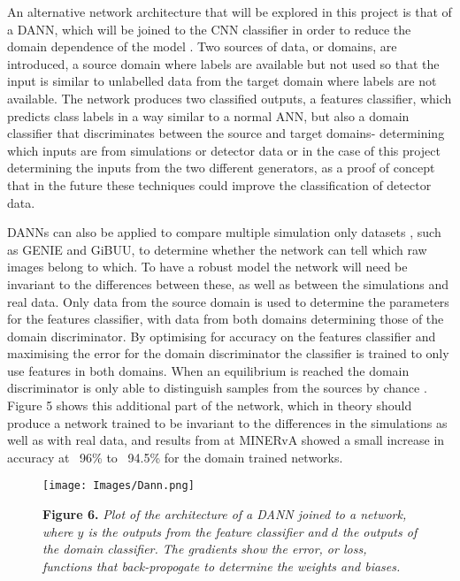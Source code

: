 \noindent An alternative network architecture that will be explored in this project is that of a DANN, which will be joined to the CNN classifier in order to reduce the domain dependence of the model \cite{Bousmalis}. Two sources of data, or domains, are introduced, a source domain where labels are available but not used so that the input is similar to unlabelled data from the target domain where labels are not available. The network produces two classified outputs, a features classifier, which predicts class labels in a way similar to a normal ANN, but also a domain classifier that discriminates between the source and target domains- determining which inputs are from simulations or detector data \cite{Ganin} or in the case of this project determining the inputs from the two different generators, as a proof of concept that in the future these techniques could improve the classification of detector data. \medskip

\noindent DANNs can also be applied to compare multiple simulation only datasets \cite{Perdue}, such as GENIE and GiBUU, to determine whether the network can tell which raw images belong to which. To have a robust model the network will need be invariant to the differences between these, as well as between the simulations and real data. Only data from the source domain is used to determine the parameters for the features classifier, with data from both domains determining those of the domain discriminator. By optimising for accuracy on the features classifier and maximising the error for the domain discriminator the classifier is trained to only use features in both domains. When an equilibrium is reached the domain discriminator is only able to distinguish samples from the sources by chance \cite{Louppe}. Figure 5 shows this additional part of the network, which in theory should produce a network trained to be invariant to the differences in the simulations as well as with real data, and results from \cite{Perdue} at MINERvA showed a small increase in accuracy at ~96\% to ~94.5\% for the domain trained networks.  \medskip

\begin{figure}[b!]
 \centering
 \texttt{[image: Images/Dann.png]} 
 
  \textbf{Figure 6.} \textit{Plot of the architecture of a DANN joined to a network, where $y$ is the outputs from the feature classifier and $d$ the  outputs of the domain classifier. The gradients show the error, or loss, functions that back-propogate to determine the weights and biases. \cite{Ganin}}
\end{figure}